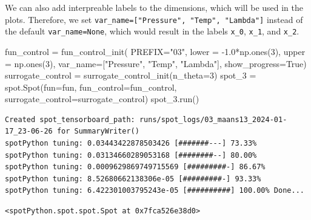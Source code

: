 \documentclass[
  letterpaper,
  DIV=11,
  numbers=noendperiod]{scrreprt}
\newenvironment{Shaded}{\begin{snugshade}}{\end{snugshade}}
\newcommand{\DecValTok}[1]{\textcolor[rgb]{0.68,0.00,0.00}{#1}}
\newcommand{\FloatTok}[1]{\textcolor[rgb]{0.68,0.00,0.00}{#1}}
\newcommand{\NormalTok}[1]{\textcolor[rgb]{0.00,0.23,0.31}{#1}}
\newcommand{\OperatorTok}[1]{\textcolor[rgb]{0.37,0.37,0.37}{#1}}
\newcommand{\StringTok}[1]{\textcolor[rgb]{0.13,0.47,0.30}{#1}}
\newcommand{\VariableTok}[1]{\textcolor[rgb]{0.07,0.07,0.07}{#1}}
\begin{document}
We can also add interpreable labels to the dimensions, which will be
used in the plots. Therefore, we set
\texttt{var\_name={[}"Pressure",\ "Temp",\ "Lambda"{]}} instead of the
default \texttt{var\_name=None}, which would result in the labels
\texttt{x\_0}, \texttt{x\_1}, and \texttt{x\_2}.

\begin{Shaded}
\begin{Highlighting}[]
\NormalTok{fun\_control }\OperatorTok{=}\NormalTok{ fun\_control\_init(}
\NormalTok{              PREFIX}\OperatorTok{=}\StringTok{"03"}\NormalTok{,}
\NormalTok{              lower }\OperatorTok{=} \OperatorTok{{-}}\FloatTok{1.0}\OperatorTok{*}\NormalTok{np.ones(}\DecValTok{3}\NormalTok{),}
\NormalTok{              upper }\OperatorTok{=}\NormalTok{ np.ones(}\DecValTok{3}\NormalTok{),}
\NormalTok{              var\_name}\OperatorTok{=}\NormalTok{[}\StringTok{"Pressure"}\NormalTok{, }\StringTok{"Temp"}\NormalTok{, }\StringTok{"Lambda"}\NormalTok{],}
\NormalTok{              show\_progress}\OperatorTok{=}\VariableTok{True}\NormalTok{)}
\NormalTok{surrogate\_control }\OperatorTok{=}\NormalTok{ surrogate\_control\_init(n\_theta}\OperatorTok{=}\DecValTok{3}\NormalTok{)}
\NormalTok{spot\_3 }\OperatorTok{=}\NormalTok{ spot.Spot(fun}\OperatorTok{=}\NormalTok{fun,}
\NormalTok{                  fun\_control}\OperatorTok{=}\NormalTok{fun\_control,}
\NormalTok{                  surrogate\_control}\OperatorTok{=}\NormalTok{surrogate\_control)}
\NormalTok{spot\_3.run()}
\end{Highlighting}
\end{Shaded}

\begin{verbatim}
Created spot_tensorboard_path: runs/spot_logs/03_maans13_2024-01-17_23-06-26 for SummaryWriter()
spotPython tuning: 0.03443422878503426 [#######---] 73.33% 
spotPython tuning: 0.03134660289053168 [########--] 80.00% 
spotPython tuning: 0.0009629869749715569 [#########-] 86.67% 
spotPython tuning: 8.52680662138306e-05 [#########-] 93.33% 
spotPython tuning: 6.422301003795243e-05 [##########] 100.00% Done...
\end{verbatim}

\begin{verbatim}
<spotPython.spot.spot.Spot at 0x7fca526e38d0>
\end{verbatim}
\end{document}
